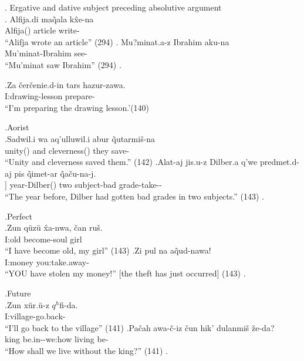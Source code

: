 \ex.\label{sent:ex5} Ergative and dative subject preceding absolutive argument \\
    \ag. Alfija.di ma\~{q}ala k\^{x}e-na \\
        Alfija(\Erg[]) article write-\Aori[] \\
        ``Alifja wrote an article'' (294)
    \bg. Mu?minat.a-z Ibrahim aku-na \\
        Mu'minat-\Dat[] Ibrahim see-\Aori \\
        ``Mu'minat saw Ibrahim'' (294)
    \z.

\exg.\label{sent:ex9}Za \v{c}er\v{c}enie.d-in tars hazur-zawa. \\
    I:\Erg[] drawing-\Gen[] lesson prepare-\Impf[] \\
    ``I'm preparing the drawing lesson.'(140)

\ex.Aorist\\
    \ag.\label{sent:ex11a}Sadwil.i wa aq'ulluwil.i abur \~{q}utarmi\v{s}-na \\
    unity(\Erg[]) and cleverness(\Erg[]) they save-\Aori[] \\
    ``Unity and cleverness saved them.'' (142)
    \bg.\label{sent:ex11b}Alat-aj jis.u-z Dilber.a q'we predmet.d-aj pis \~{q}imet-ar \~{q}a\v{c}u-na-j. \\
    [pass-\Aop[]] year-\Dat[] Dilber(\Erg[]) two subject-\Inel[] bad grade-\Pl[] take-\Aori[]-\Pst[] \\
    ``The year before, Dilber had gotten bad grades in two subjects.'' (143)
    \z.

\ex.Perfect\\
    \ag.\label{sent:ex12a}Zun q\"{u}z\"{u} \^{x}a-nwa, \v{c}an ru\v{s}. \\
    I:\Abs[] old become-\Prf[] soul girl \\
    ``I have become old, my girl'' (143)
    \bg.\label{sent:ex12b}Zi pul na a\~{q}ud-nawa! \\
    I:\Gen[] money you:\Erg[] take.away-\Prf[] \\
    ``YOU have stolen my money!'' [the theft has just occurred] (143)
    \z.

\ex.Future \\
    \ag.\label{sent:ex10a}Zun x\"{u}r.\"{u}-z $q^h$fi-da. \\
    I:\Abs[] village-\Dat[] go.back-\Fut[] \\
    ``I'll go back to the village'' (141)
    \bg.\label{sent:ex10b}Pa\v{c}ah awa-\v{c}-iz \v{c}un hik' dulanmi\v{s} \v{z}e-da? \\
    king be.in-\Neg[]-\Imc[] we:\Abs[] how living be-\Fut[] \\
    ``How shall we live without the king?'' (141)
    \z.

